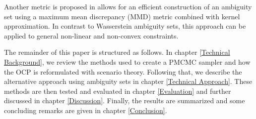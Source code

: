 Another metric is proposed in \cite{Yassine_22} allows for an efficient construction of an ambiguity set using a maximum mean discrepancy (MMD) metric combined with kernel approximation. In contrast to Wasserstein ambiguity sets, this approach can be applied to general non-linear and non-convex constraints.

The remainder of this paper is structured as follows. In chapter \ref{Technical Background}, we review the methods used to create a PMCMC sampler and how the OCP is reformulated with scenario theory. Following that, we describe the alternative approach using ambiguity sets in chapter \ref{Technical Approach}. These methods are then tested and evaluated in chapter \ref{Evaluation} and further discussed in chapter \ref{Discussion}. Finally, the results are summarized and some concluding remarks are given in chapter \ref{Conclusion}.



